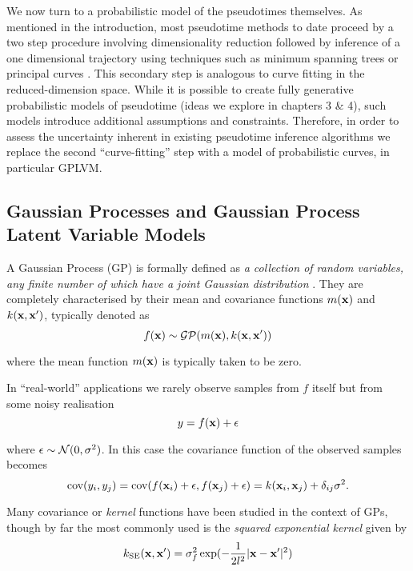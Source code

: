 We now turn to a probabilistic model of the pseudotimes themselves. As mentioned in the introduction, most pseudotime methods to date proceed by a two step procedure involving dimensionality reduction followed by inference of a one dimensional trajectory using techniques such as minimum spanning trees \cite{Trapnell2014-xi,Ji2016-gx} or principal curves \cite{Marco2014-ug,campbell2015laplacian,cannoodt2016scorpius}. This secondary step is analogous to curve fitting in the reduced-dimension space. While it is possible to create fully generative probabilistic models of pseudotime (ideas we explore in chapters 3 \& 4), such models introduce additional assumptions and constraints. Therefore, in order to assess the uncertainty inherent in existing pseudotime inference algorithms we replace the second ``curve-fitting'' step with a model of probabilistic curves, in particular GPLVM.

\subsection{Gaussian Processes and Gaussian Process Latent Variable Models}

A Gaussian Process (GP) is formally defined as \emph{a collection of random variables, any finite number of which have a joint Gaussian distribution} \cite{rasmussen2006gaussian}. They are completely characterised by their mean and covariance functions $m({\bf x})$ and $k({\bf x}, {\bf x}')$, typically denoted as
\begin{equation}
	f({\bf x}) \sim \mathcal{GP}(m({\bf x}), k({\bf x}, {\bf x}'))
\end{equation}

where the mean function $m({\bf x})$ is typically taken to be zero.

In ``real-world'' applications we rarely observe samples from $f$ itself but from some noisy realisation
\begin{equation}
	y = f({\bf x}) + \epsilon
\end{equation}

where $\epsilon \sim \mathcal{N}(0, \sigma^2)$. In this case the covariance function of the observed samples becomes
\begin{equation}
	\text{cov}(y_i, y_j) = \text{cov}(f({\bf x}_i) + \epsilon, f({\bf x}_j) + \epsilon) = k({\bf x}_i, {\bf x}_j) + \delta_{ij} \sigma^2.
\end{equation}

Many covariance or \emph{kernel} functions have been studied in the context of GPs, though by far the most commonly used is the \emph{squared exponential kernel} given by
 \begin{equation}
 	k_{\text{SE}}({\bf x}, {\bf x}') = \sigma_f^2 \exp(-\frac{1}{2l^2}|{\bf x} - {\bf x}'|^2)
 \end{equation}

